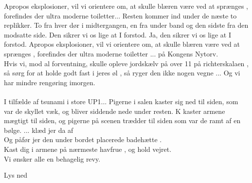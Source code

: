 \documentclass[a4paper,11pt]{article}
\begin{document}
\begin{sketch}
Apropos eksplosioner, vil vi orientere om, at skulle blæren være ved at sprænges , forefindes der ultra moderne toiletter... 
\scene Resten kommer ind under de næste to replikker. To fra hver dør i midtergangen, en fra under band og den sidste fra den modsatte side.
 Den sikrer vi os lige at I forstod.
 Ja, den sikrer vi os lige at I forstod.
Apropos eksplosioner, vil vi orientere om, at skulle blæren være ved at sprænges , forefindes der ultra moderne toiletter ...  på Kongens Nytorv.  \\
Hvis vi, mod al forventning, skulle opleve jordskælv på over 11 på richterskalaen , så sørg for at holde godt fast i jeres øl , så ryger den ikke nogen vegne ...  Og vi har mindre rengøring imorgen. \\ \\
I tilfælde af tsunami i store UP1...
\scene Pigerne i salen kaster sig ned til siden, som var de skyllet væk, og bliver siddende nede under resten.
\scene K kaster armene mægtigt til siden, og pigerne på scenen trædder til siden som var de ramt af en bølge.
 ... klæd jer da af  \\
Og påfør jer den under bordet placerede badehætte . \\
Kast dig i armene på nærmeste havfrue , og hold vejret. \\
 Vi ønsker alle en behagelig revy.

\scene Lys ned
\end{sketch}
\end{document}
